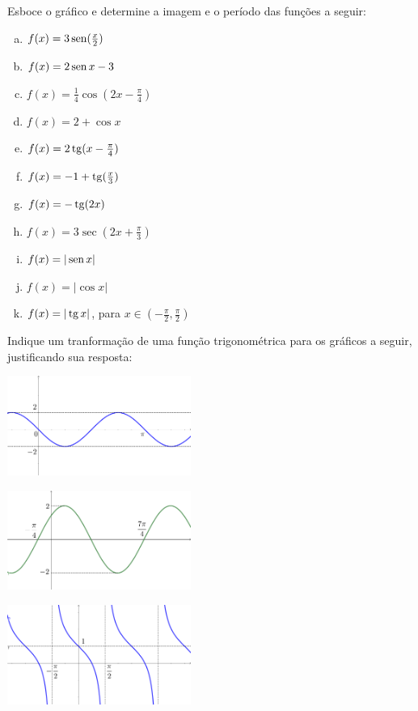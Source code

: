 \begin{secExercicios}
\begin{exer}
    Esboce o gráfico e determine a imagem e o período das funções a seguir:
    \begin{enumerate}[a)]
        \item $f(x)=3\operatorname{sen}(\frac{x}{2})$
        \item $f(x)=2\operatorname{sen} x-3$
        \item $f(x)=\frac{1}{4}\cos(2x-\frac{\pi}{4})$
        \item $f(x)=2+\cos x$
        \item $f(x)=2\operatorname{tg}(x-\frac{\pi}{4})$
        \item $f(x)=-1+\operatorname{tg}(\frac{x}{3})$
        \item $f(x)=-\operatorname{tg}(2x)$
        \item $f(x)=3\sec(2x+\frac{\pi}{3})$
        \item $f(x)=|\operatorname{sen} x|$
        \item $f(x)=|\cos x|$
        \item $f(x)=|\operatorname{tg} x|$, para $x\in(-\frac{\pi}{2}, \frac{\pi}{2})$
    \end{enumerate}
\end{exer}

\begin{exer}
    Indique um tranformação de uma função trigonométrica para os gráficos a seguir, justificando sua resposta:

    \begin{center}
        \includegraphics[width=6cm]{cap_trigon/figs/Grafico4.png}
        \vspace{.3cm}
        
        \includegraphics[width=6cm]{cap_trigon/figs/Grafico1.png}
        \vspace{.3cm}
        
        \includegraphics[width=6cm]{cap_trigon/figs/Grafico2.png}
        \vspace{.3cm}
        

\end{center}
\end{exer}
\end{secExercicios}
